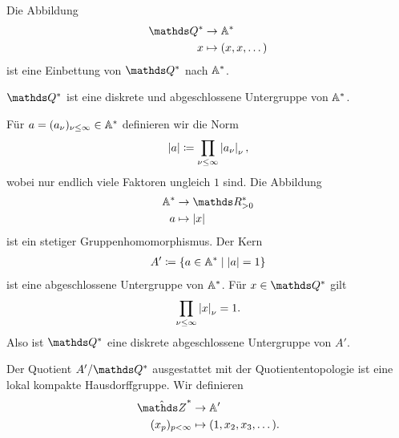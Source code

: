Die Abbildung
\begin{align*}
\Q^\ast &\to \A^\ast\\
x&\mapsto (x,x,\dots)
\end{align*}
ist eine Einbettung von $\Q^\ast$ nach $\mathbb{A}^\ast$.

\begin{prop}
$\Q^\ast$ ist eine diskrete und abgeschlossene Untergruppe von $\mathbb{A}^\ast$.
\end{prop}

Für $a=(a_\nu)_{\nu \leq \infty} \in \mathbb{A}^\ast$ definieren wir die Norm
\begin{align*}
\left\vert a\right\vert\coloneqq \prod_{\nu \leq \infty} \left\vert a_\nu\right\vert_\nu,
\end{align*}
wobei nur endlich viele Faktoren ungleich $1$ sind.
Die Abbildung
\begin{align*}
\A^\ast &\to \R_{>0}^\ast\\
a &\mapsto \abs{x}
\end{align*}
ist ein stetiger Gruppenhomomorphismus.
Der Kern
\begin{align*}
A'\coloneqq \{a \in \mathbb{A}^\ast \mid \left\vert a\right\vert=1\}
\end{align*}
ist eine abgeschlossene Untergruppe von $\mathbb{A}^\ast$.
Für $x \in \Q^\ast$ gilt
\begin{align*}
\prod_{\nu \leq \infty} \left\vert x\right\vert_\nu=1.
\end{align*}
Also ist $\Q^\ast$ eine diskrete abgeschlossene Untergruppe von $A'$.


Der Quotient $A'/\Q^\ast$ ausgestattet mit der Quotiententopologie ist eine lokal kompakte Hausdorffgruppe.
Wir definieren
\begin{align*}
\hat{\Z}^\ast &\to \A'\\
(x_p)_{p<\infty} &\mapsto (1,x_2,x_3,\dots).
\end{align*}


